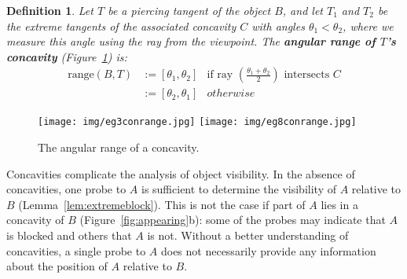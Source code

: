 \documentclass[10pt,twocolumn]{article}
\newtheorem{defn2}{Definition}
\begin{document}


\begin{defn2}
\label{defn:concavityrange}
Let $T$ be a piercing tangent of the object $B$,
and let $T_1$ and $T_2$ be the extreme tangents of the associated concavity $C$
with angles $\theta_1 < \theta_2$,
where we measure this angle using the ray from the viewpoint.
The {\bf angular range of $T$'s concavity} (Figure~\ref{fig:conrange}) is:
\begin{eqnarray*}
\mbox{range}(B,T) & := [\theta_1,\theta_2] & \mbox{if ray } 
(\frac{\theta_1 + \theta_2}{2}) \mbox{ intersects $C$} \\
              & := [\theta_2, \theta_1] & otherwise
\end{eqnarray*}
\end{defn2}


\begin{figure}
\begin{center}
\texttt{[image: img/eg3conrange.jpg]}
\texttt{[image: img/eg8conrange.jpg]}
\end{center}
\caption{The angular range of a concavity.}
\label{fig:conrange}
\end{figure}

Concavities complicate the analysis of object visibility.
In the absence of concavities, one probe to $A$ is sufficient to determine 
the visibility of $A$ relative to $B$ (Lemma~\ref{lem:extremeblock}).
This is not the case if part of $A$ lies in a concavity of $B$ 
(Figure~\ref{fig:appearing}b):
some of the probes may indicate that $A$ is blocked and others that $A$ is not.
Without a better understanding of concavities, 
a single probe to $A$ does not necessarily provide any information about the position of 
$A$ relative to $B$.


\end{document}
